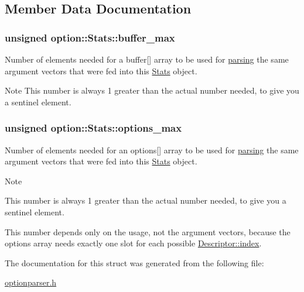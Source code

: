 \subsection{\-Member \-Data \-Documentation}
\hypertarget{structoption_1_1_stats_a2c9a7b4174f91ba8bcadaa9ad6f0db06}{
\subsubsection[{buffer\-\_\-max}]{\setlength{\rightskip}{0pt plus 5cm}unsigned {\bf option\-::\-Stats\-::buffer\-\_\-max}}}\label{structoption_1_1_stats_a2c9a7b4174f91ba8bcadaa9ad6f0db06}


\-Number of elements needed for a {\ttfamily buffer}\mbox{[}\mbox{]} array to be used for \hyperlink{classoption_1_1_parser_a6e0b5778d1cfbd6cd51240e74d01e138}{parsing} the same argument vectors that were fed into this \hyperlink{structoption_1_1_stats}{\-Stats} object. 

\begin{DoxyNote}{\-Note}
\-This number is always 1 greater than the actual number needed, to give you a sentinel element. 
\end{DoxyNote}
\hypertarget{structoption_1_1_stats_a8121787feb1c7db84fca3ccb012b0473}{
\subsubsection[{options\-\_\-max}]{\setlength{\rightskip}{0pt plus 5cm}unsigned {\bf option\-::\-Stats\-::options\-\_\-max}}}\label{structoption_1_1_stats_a8121787feb1c7db84fca3ccb012b0473}


\-Number of elements needed for an {\ttfamily options}\mbox{[}\mbox{]} array to be used for \hyperlink{classoption_1_1_parser_a6e0b5778d1cfbd6cd51240e74d01e138}{parsing} the same argument vectors that were fed into this \hyperlink{structoption_1_1_stats}{\-Stats} object. 

\begin{DoxyNote}{\-Note}
\begin{DoxyItemize}
\item \-This number is always 1 greater than the actual number needed, to give you a sentinel element. \item \-This number depends only on the {\ttfamily usage}, not the argument vectors, because the {\ttfamily options} array needs exactly one slot for each possible \hyperlink{structoption_1_1_descriptor_a1fee8ac44f529c99ac2b1149b4c391b1}{\-Descriptor\-::index}. \end{DoxyItemize}

\end{DoxyNote}


\-The documentation for this struct was generated from the following file\-:\begin{DoxyCompactItemize}
\item 
\hyperlink{optionparser_8h}{optionparser.\-h}\end{DoxyCompactItemize}
